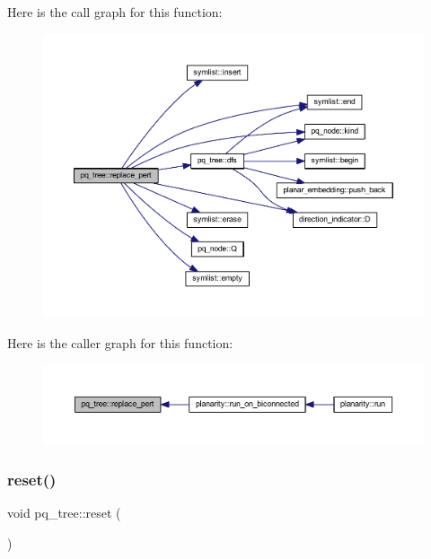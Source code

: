 Here is the call graph for this function\+:\nopagebreak
\begin{figure}[H]
\begin{center}
\leavevmode
\includegraphics[width=350pt]{classpq__tree_ae98dec503a8e312db7fd5f28360f3f0e_cgraph}
\end{center}
\end{figure}
Here is the caller graph for this function\+:\nopagebreak
\begin{figure}[H]
\begin{center}
\leavevmode
\includegraphics[width=350pt]{classpq__tree_ae98dec503a8e312db7fd5f28360f3f0e_icgraph}
\end{center}
\end{figure}
\mbox{\label{classpq__tree_a1e2bdfb9af85972e9254260d74c63651}} 
\subsubsection{\texorpdfstring{reset()}{reset()}}
{\footnotesize\ttfamily void pq\+\_\+tree\+::reset (\begin{DoxyParamCaption}{ }\end{DoxyParamCaption})}



